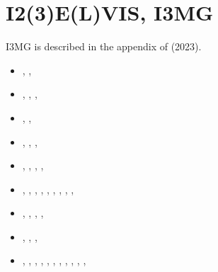 \section{I2(3)E(L)VIS, I3MG}  

I3MG is described in the appendix of \textcite{fava23} (2023).

\begin{small}
\begin{itemize}
\item[\twothousandthree]     \textcite{geyu03}, \textcite{geyu03b}, 
                             \textcite{geur03}
\item[\twothousandfour]      \textcite{geym04}, \textcite{geys04}, 
                             \textcite{gepm04}, \textcite{geur04}
\item[\twothousandfive]      \textcite{buge05}, \textcite{mage05},
                             \textcite{stge05}
\item[\twothousandsix]       \textcite{bube06},  \textcite{gest06},
                             \textcite{gogc06},  \textcite{gecy06}
\item[\twothousandseven]     \textcite{geyu07},  \textcite{gogc07},
                             \textcite{gebu07},  \textcite{gogg07},
                             \textcite{gowg07}
\item[\twothousandeight]     \textcite{scbe08},  \textcite{gecy08},
                             \textcite{uegs08},  \textcite{fagc08},
                             \textcite{zhgy09},  \textcite{buge08},
                             \textcite{cage08},  \textcite{migb08},
                             \textcite{nigc08},  \textcite{gepb08}
\item[\twothousandnine]      \textcite{gefc09},  \textcite{bubg09},
                             \textcite{ligt09},  \textcite{famg09},
                             \textcite{lige09}
\item[\twothousandten]       \textcite{nigm10},  \textcite{bagc10},
                             \textcite{ligb10},  \textcite{sigb10}
\item[\twothousandeleven]    \textcite{dugm11},  \textcite{dumg11},
                             \textcite{lixg11},  \textcite{gery11},
                             \textcite{geme11},  \textcite{blgg11},
                             \textcite{nigm11},  \textcite{gokg11},
                             \textcite{ligt11},  \textcite{pege11},
                             \textcite{zhgh11},  \textcite{gery11b}

\end{itemize}
\end{small}
